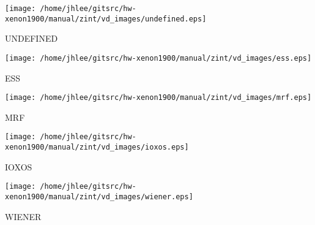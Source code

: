 \noindent
\vspace{1cm}
\begin{minipage}{.2\textwidth}
\begin{center}
\texttt{[image: /home/jhlee/gitsrc/hw-xenon1900/manual/zint/vd\_images/undefined.eps]}
\end{center}
\end{minipage}
\begin{minipage}{.7\textwidth}
UNDEFINED
\end{minipage}


\noindent
\vspace{1cm}
\begin{minipage}{.2\textwidth}
\begin{center}
\texttt{[image: /home/jhlee/gitsrc/hw-xenon1900/manual/zint/vd\_images/ess.eps]}
\end{center}
\end{minipage}
\begin{minipage}{.7\textwidth}
ESS
\end{minipage}


\noindent
\vspace{1cm}
\begin{minipage}{.2\textwidth}
\begin{center}
\texttt{[image: /home/jhlee/gitsrc/hw-xenon1900/manual/zint/vd\_images/mrf.eps]}
\end{center}
\end{minipage}
\begin{minipage}{.7\textwidth}
MRF
\end{minipage}


\noindent
\vspace{1cm}
\begin{minipage}{.2\textwidth}
\begin{center}
\texttt{[image: /home/jhlee/gitsrc/hw-xenon1900/manual/zint/vd\_images/ioxos.eps]}
\end{center}
\end{minipage}
\begin{minipage}{.7\textwidth}
IOXOS
\end{minipage}


\noindent
\vspace{1cm}
\begin{minipage}{.2\textwidth}
\begin{center}
\texttt{[image: /home/jhlee/gitsrc/hw-xenon1900/manual/zint/vd\_images/wiener.eps]}
\end{center}
\end{minipage}
\begin{minipage}{.7\textwidth}
WIENER
\end{minipage}


